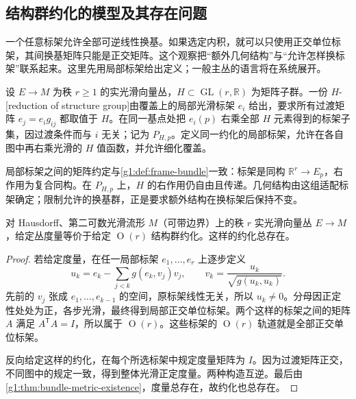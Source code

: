 \subsection{结构群约化的模型及其存在问题}
\label{g1:subsec:1204:03}

一个任意标架允许全部可逆线性换基。如果选定内积，就可以只使用正交单位标架，其间换基矩阵只能是正交矩阵。这个观察把“额外几何结构”与“允许怎样换标架”联系起来。这里先用局部标架给出定义；一般主丛的语言将在系统展开。

\begin{definition}
	\label{g1:def:frame-structure-reduction}
	设 \(E\to M\) 为秩 \(r\geq1\) 的实光滑向量丛，\(H\subset\operatorname{GL}(r,\mathbb R)\) 为矩阵子群。一份 \(H\)-[reduction of structure group]由覆盖上的局部光滑标架 \(e_i\) 给出，要求所有过渡矩阵 \(e_j=e_i g_{ij}\) 都取值于 \(H\)。在同一基点处把 \(e_i(p)\) 右乘全部 \(H\) 元素得到的标架子集，因过渡条件而与 \(i\) 无关；记为 \(P_{H,p}\)。定义同一约化的局部标架，允许在各自图中再右乘光滑的 \(H\) 值函数，并允许细化覆盖。
\end{definition}

局部标架之间的矩阵约定与\cref{g1:def:frame-bundle}一致：标架是同构 \(\mathbb R^r\to E_p\)，右作用为复合同构。在 \(P_{H,p}\) 上，\(H\) 的右作用仍自由且传递。几何结构由这组适配标架确定；限制允许的换基群，正是要求额外结构在换标架后保持不变。

\begin{proposition}
	\label{g1:prop:metric-orthogonal-reduction}
	对 Hausdorff、第二可数光滑流形 \(M\)（可带边界）上的秩 \(r\) 实光滑向量丛 \(E\to M\)，给定丛度量等价于给定 \(\operatorname{O}(r)\) 结构群约化。这样的约化总存在。
\end{proposition}

\begin{proof}
	若给定度量，在任一局部标架 \(e_1,\ldots,e_r\) 上逐步定义
	\[
		u_k=e_k-\sum_{j<k}g(e_k,v_j)v_j,
		\qquad v_k=\frac{u_k}{\sqrt{g(u_k,u_k)}}.
	\]
	先前的 \(v_j\) 张成 \(e_1,\ldots,e_{k-1}\) 的空间，原标架线性无关，所以 \(u_k\neq0\)。分母因正定性处处为正，各步光滑，最终得到局部正交单位标架。两个这样的标架之间的矩阵 \(A\) 满足 \(A^{\mathsf T}A=I\)，所以属于 \(\operatorname{O}(r)\)。这些标架的 \(\operatorname{O}(r)\) 轨道就是全部正交单位标架。

	反向给定这样的约化，在每个所选标架中规定度量矩阵为 \(I\)。因为过渡矩阵正交，不同图中的规定一致，得到整体光滑正定度量。两种构造互逆。最后由\cref{g1:thm:bundle-metric-existence}，度量总存在，故约化也总存在。
\end{proof}

